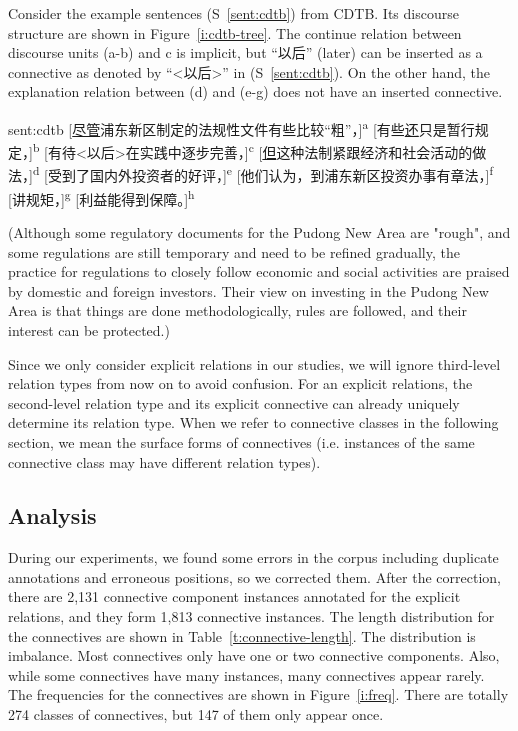 Consider the example sentences (S~\ref{sent:cdtb}) from CDTB. Its discourse
structure are shown in Figure~\ref{i:cdtb-tree}. The continue relation between
discourse units (a-b) and c is implicit, but ``以后'' (later) can be inserted
as a connective as denoted by ``<以后>'' in (S~\ref{sent:cdtb}).
On the other hand, the explanation relation between (d) and (e-g)
does not have an inserted connective.


\begin{sent}{sent:cdtb}{}
    [\underline{尽管}浦东新区制定的法规性文件有些比较``粗''，]\textsuperscript{a}
    [有些\underline{还}只是暂行规定，]\textsuperscript{b}
    [有待<以后>在实践中逐步完善，]\textsuperscript{c}
    [\underline{但}这种法制紧跟经济和社会活动的做法，]\textsuperscript{d}
    [受到了国内外投资者的好评，]\textsuperscript{e}
    [他们认为，到浦东新区投资办事有章法，]\textsuperscript{f}
    [讲规矩，]\textsuperscript{g}
    [利益能得到保障。]\textsuperscript{h}

    (Although some regulatory documents for the Pudong New Area are "rough",
    and some regulations are still temporary and
    need to be refined gradually,
    the practice for regulations to closely follow economic and social activities
    are praised by domestic and foreign investors.
    Their view on investing in the Pudong New Area is that
    things are done methodologically,
    rules are followed,
    and their interest can be protected.)
\end{sent}



Since we only consider explicit relations in our studies, we will ignore
third-level relation types from now on to avoid confusion.
For an explicit relations, the second-level relation type and its explicit
connective can already uniquely determine its relation type.
When we refer to connective classes in the following section, we mean the
surface forms of connectives (i.e. instances of the same connective class
may have different relation types).

\subsection{Analysis}

During our experiments, we found some errors in the corpus including
duplicate annotations and erroneous positions, so we corrected
them. After the correction, there are 2,131 connective component instances
annotated for the explicit relations, and they form 1,813 connective instances.
The length distribution for the connectives are shown in Table~\ref{t:connective-length}.
The distribution is imbalance. Most connectives only have
one or two connective components. Also, while some connectives have many instances,
many connectives appear rarely. The frequencies for the connectives are shown
in Figure~\ref{i:freq}. There are totally 274 classes of connectives, but
147 of them only appear once.

